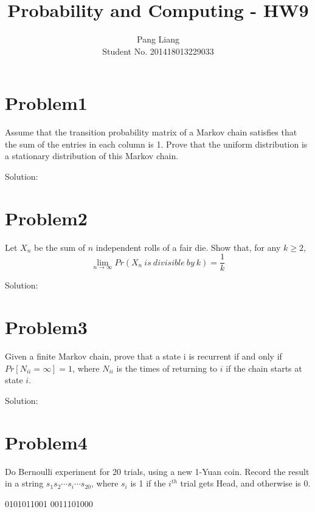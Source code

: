 \documentclass[12pt]{article}
\title{Probability and Computing - HW9}
\author{Pang Liang\\ Student No. 201418013229033}
\begin{document}
\maketitle

\section{Problem1}
Assume that the transition probability matrix of a Markov chain satisfies that the sum of the entries in each column is 1. Prove that the uniform distribution is a stationary distribution of this Markov chain.

Solution:\\


\section{Problem2}
Let $X_n$ be the sum of $n$ independent rolls of a fair die. Show that, for any $k \ge 2$,
\begin{equation}
    \lim_{n \to \infty} Pr(X_n\ is\ divisible\ by\ k) = \frac{1}{k}
\end{equation}

Solution:\\



\section{Problem3}
Given a finite Markov chain, prove that a state i is recurrent if and only if $Pr[N_{ii} = \infty] = 1$, where $N_{ii}$ is the times of returning to $i$ if the chain starts at state $i$.

Solution:\\


\section{Problem4}
Do Bernoulli experiment for 20 trials, using a new 1-Yuan coin. Record the result in a
string $s_1s_2 \cdots s_i \cdots s_{20}$, where $s_i$ is 1 if the $i^{th}$ trial gets Head, and otherwise is 0.

0101011001 0011101000
\end{document}
